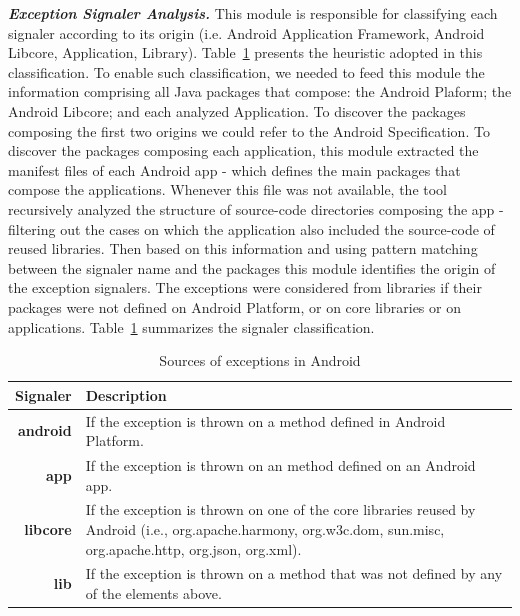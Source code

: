 \documentclass[conference]{IEEEtran}
\begin{document}
\emph{\textbf{Exception Signaler Analysis.}}
This module is responsible for classifying each signaler according 
to its origin (i.e. Android Application Framework, Android Libcore, Application, Library). 
Table~\ref{tab:signalers} presents the heuristic adopted in this classification.
To enable such classification, we needed to feed this module the information
comprising all Java packages that compose: the Android Plaform;
 the Android Libcore; and each analyzed Application. 
To discover the packages composing the first two origins
we could refer to the Android Specification.
To discover the packages composing each application, this module 
extracted the manifest files of each Android app
 - which defines the main packages that compose the applications.
 Whenever this file was not available, the tool recursively analyzed the 
structure of source-code directories composing the app
- filtering out the cases on which the application 
also included the source-code of reused libraries.
Then based on this information and using pattern matching 
between the signaler name and the packages this module identifies 
the origin of the exception signalers. The exceptions were considered
 from libraries if their packages were not defined 
on Android Platform, or on core libraries or on applications.
Table~\ref{tab:signalers} summarizes the signaler classification.


\begin{table}
  \centering
  \begin{tabular}{rp{29em}}
    \hline
    \bfseries{Signaler} & \bfseries{Description} \\
    \hline
    \bfseries{android} & If the exception is thrown on a method defined in Android Platform.\\
    \bfseries{app}     & If the exception is thrown on an method defined on an Android app.\\
    \bfseries{libcore} & If the exception is thrown on one of the core libraries reused by Android (i.e., org.apache.harmony, org.w3c.dom, sun.misc, org.apache.http, org.json, org.xml). \\
    \bfseries{lib}     & If the exception is thrown on a method that was not defined by any of the elements above.\\
    \hline
  \end{tabular}
  \caption{Sources of exceptions in Android}
  \label{tab:signalers}
\end{table}
\end{document}
